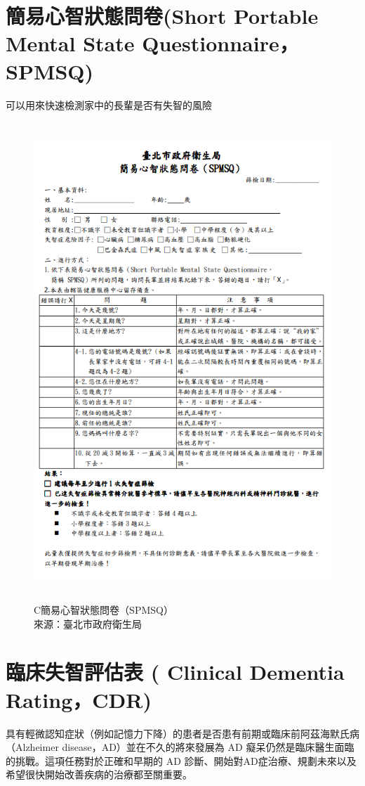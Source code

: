 \section{簡易心智狀態問卷(Short Portable Mental State Questionnaire，SPMSQ)}
可以用來快速檢測家中的長輩是否有失智的風險
\begin{figure}[H]
	\centerline{\includegraphics[height=18cm]{pic/SPMSQ.PNG}}
	\caption{C簡易心智狀態問卷（SPMSQ）\\來源：臺北市政府衛生局}
	
	\label{fig:SPMSQ}
\end{figure}

\label{sec:background}
\section{臨床失智評估表 ( Clinical Dementia Rating，CDR)}

具有輕微認知症狀（例如記憶力下降）的患者是否患有前期或臨床前阿茲海默氏病（Alzheimer disease，AD）並在不久的將來發展為 AD 癡呆仍然是臨床醫生面臨的挑戰。這項任務對於正確和早期的 AD 診斷、開始對AD症治療、規劃未來以及希望很快開始改善疾病的治療都至關重要。

